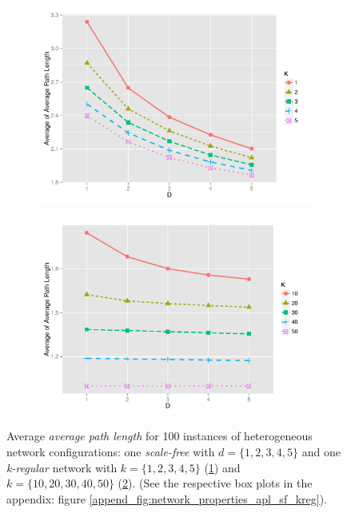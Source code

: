 \documentclass[preprint,number]{elsarticle}
\begin{document}
\begin{figure}[H]
	\centering
	\begin{subfigure}{.5\linewidth}
		\centering
		\includegraphics[width=1\linewidth]{"../analysis/pdf/network_properties_apl_line_sf_kreg_12345"}
		\caption{}
		\label{fig:network_properties_apl_line_sf_kreg_12345}
	\end{subfigure}%
	\begin{subfigure}{.5\linewidth}
		\centering
		\includegraphics[width=1\linewidth]{"../analysis/pdf/network_properties_apl_line_sf_kreg_1020304050"}
		\caption{}
		\label{fig:network_properties_apl_line_sf_kreg_1020304050}
	\end{subfigure}
	\begin{minipage}{0.9\textwidth}
		\vspace{0.2cm}
		\caption{Average \textit{average path  length} for 100 instances of heterogeneous network configurations:  one \textit{scale-free} with $d=\{1,2,3,4,5\}$ and one \textit{k-regular} network with $k=\{1,2,3,4,5\}$ (\ref{fig:network_properties_apl_line_sf_kreg_12345}) and $k=\{10,20,30,40,50\}$ (\ref{fig:network_properties_apl_line_sf_kreg_1020304050}). (See the respective box plots in the appendix: figure \ref{append_fig:network_properties_apl_sf_kreg}).}
		\label{fig:network_properties_line_apl_sf_kreg}
	\end{minipage}
\end{figure}
\end{document}
